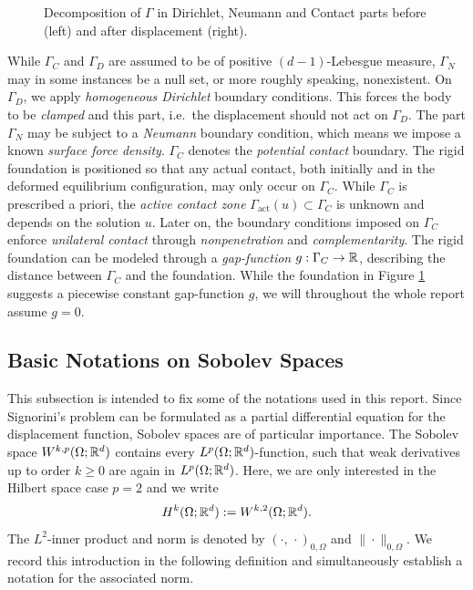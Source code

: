 \begin{figure}[!h]
	\centering
	
	\caption{Decomposition of $\Gamma$ in Dirichlet, Neumann and Contact parts before (left) and after displacement (right).}
	\label{fig:setup}
\end{figure}

While $\Gamma_C$ and $\Gamma_D$ are assumed to be of positive $(d-1)$-Lebesgue measure, $\Gamma_N$ may in some instances be a null set, or more roughly speaking, nonexistent. On $\Gamma_D$, we apply {\em homogeneous Dirichlet} boundary conditions. This forces the body to be {\em clamped} and this part, i.e.\ the displacement should not act on $\Gamma_D$. The part $\Gamma_N$ may be subject to a {\em Neumann} boundary condition, which means we impose a known {\em surface force density}. $\Gamma_C$ denotes the {\em potential contact} boundary.  The rigid foundation is  positioned so that any actual contact, both initially and in the deformed equilibrium configuration, may only occur on $\Gamma_C$. While $\Gamma_C$ is prescribed a priori, the {\em active contact zone} $\Gamma_{\mathrm{act}}(u)\subset\Gamma_C$ is unknown and depends on the solution $u$. Later on, the boundary conditions imposed on $\Gamma_C$ enforce {\em unilateral contact} through {\em nonpenetration} and {\em complementarity}. The rigid foundation can be modeled through a {\em gap-function} $g:\Gamma_C\to{\mathbb R}$, describing the distance between $\Gamma_C$ and the foundation. While the foundation in Figure \ref{fig:setup} suggests a piecewise constant gap-function $g$, we will throughout the whole report assume $g = 0$.

\subsection{Basic Notations on Sobolev Spaces}

This subsection is intended to fix some of the notations used in this report. Since Signorini's problem can be formulated as a partial differential equation for the displacement function, Sobolev spaces are of particular importance. The Sobolev space $W^{k,p}(\Omega;{\mathbb R}^d)$ contains every $L^p(\Omega;{\mathbb R}^d)$-function, such that weak derivatives up to order $k\ge 0$ are again in $L^p(\Omega;{\mathbb R}^d)$. Here, we are only interested in the Hilbert space case $p= 2$ and we write
\begin{equation*}
	H^k(\Omega;{\mathbb R}^d):= W^{k,2}(\Omega;{\mathbb R}^d).
\end{equation*}
The $L^2$-inner product and norm is denoted by $(\cdot,\,\cdot)_{0,\Omega}$ and $\|\cdot\|_{0,\Omega}$. We record this introduction in the following definition and simultaneously establish a notation for the associated norm.

